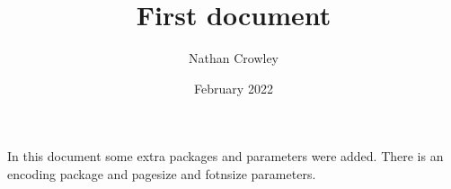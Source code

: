 \documentclass[12pt, letterpaper]{article}
\title{First document}
\author{Nathan Crowley}
\date{February 2022}
\begin{document}
\begin{titlepage}
\maketitle
\end{titlepage}

In this document some extra packages and parameters were added. There is an encoding package and pagesize and fotnsize parameters.
\end{document}
